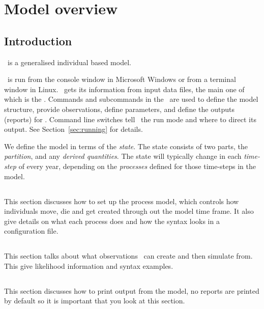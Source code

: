 \section{Model overview\label{sec:overview}}

\subsection{Introduction}

\IBM\ is a generalised individual based model. 

\IBM\ is run from the console window in Microsoft Windows or from a terminal window in Linux. \IBM\ gets its information from input data files, the main one of which is the \emph{\config}. Commands and subcommands in the \config\ are used to define the model structure, provide observations, define parameters, and define the outputs (reports) for \IBM. Command line switches tell \IBM\ the run mode and where to direct its output. See Section~\ref{sec:running} for details.

We define the model in terms of the \emph{state}. The state consists of two parts, the \emph{partition}, and any \emph{derived quantities}. The state will typically change in each \emph{time-step} of every year, depending on the \emph{processes} defined for those time-steps in the model. 

\subsection{}
This section discusses how to set up the process model, which controls how individuals move, die and get created through out the model time frame. It also give details on what each process does and how the syntax looks in a configuration file.

\subsection{}
This section talks about what observations \IBM\ can create and then simulate from. This give likelihood information and syntax examples.

\subsection{}
This section discusses how to print output from the model, no reports are printed by default so it is important that you look at this section.